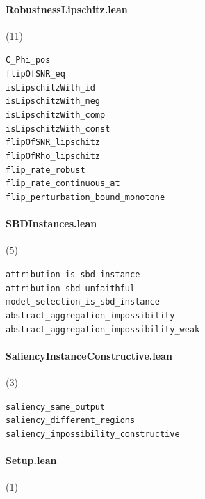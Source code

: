 \paragraph{RobustnessLipschitz.lean} (11)

{\footnotesize
\texttt{C\_Phi\_pos}\\
\texttt{flipOfSNR\_eq}\\
\texttt{isLipschitzWith\_id}\\
\texttt{isLipschitzWith\_neg}\\
\texttt{isLipschitzWith\_comp}\\
\texttt{isLipschitzWith\_const}\\
\texttt{flipOfSNR\_lipschitz}\\
\texttt{flipOfRho\_lipschitz}\\
\texttt{flip\_rate\_robust}\\
\texttt{flip\_rate\_continuous\_at}\\
\texttt{flip\_perturbation\_bound\_monotone}\\
}

\paragraph{SBDInstances.lean} (5)

{\footnotesize
\texttt{attribution\_is\_sbd\_instance}\\
\texttt{attribution\_sbd\_unfaithful}\\
\texttt{model\_selection\_is\_sbd\_instance}\\
\texttt{abstract\_aggregation\_impossibility}\\
\texttt{abstract\_aggregation\_impossibility\_weak}\\
}

\paragraph{SaliencyInstanceConstructive.lean} (3)

{\footnotesize
\texttt{saliency\_same\_output}\\
\texttt{saliency\_different\_regions}\\
\texttt{saliency\_impossibility\_constructive}\\
}

\paragraph{Setup.lean} (1)


